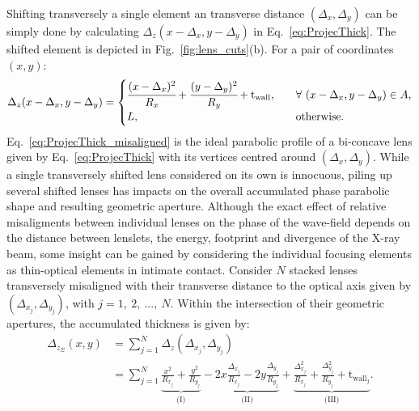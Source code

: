 \begin{refsection}
Shifting transversely a single element an transverse distance $(\Delta_x,\Delta_y)$ can be simply done by calculating $\Delta_z(x-\Delta_x,y-\Delta_y)$ in Eq.~\ref{eq:ProjecThick}. The shifted element is depicted in Fig.~\ref{fig:lens_cuts}(b). For a pair of coordinates $(x,y)$:
\begin{equation}\label{eq:ProjecThick_misaligned}
    \Delta_z(x-\Delta_x,y-\Delta_y) = 
        \begin{cases}
      \cfrac{(x-\Delta_x)^2}{R_x}+\cfrac{(y-\Delta_y)^2}{R_y}+\text{t}_\text{wall}, &\quad\forall~(x-\Delta_x,y-\Delta_y) \in A,\\
      L, &\quad\text{otherwise}.
        \end{cases}
\end{equation}   
Eq.~\ref{eq:ProjecThick_misaligned} is the ideal parabolic profile of a bi-concave lens given by Eq.~\ref{eq:ProjecThick} with its vertices centred around $(\Delta_x,\Delta_y)$. While a single transversely shifted lens considered on its own is innocuous, piling up several shifted lenses has impacts on the overall accumulated phase parabolic shape and resulting geometric aperture. Although the exact effect of relative misaligments between individual lenses on the phase of the wave-field depends on the distance between lenslets, the energy, footprint and divergence of the X-ray beam, some insight can be gained by considering the individual focusing elements as thin-optical elements in intimate contact. Consider $N$ stacked lenses transversely misaligned with their transverse distance to the optical axis given by $(\Delta_{x_j},\Delta_{y_j})$, with $j=1,~2,~...,~N$. Within the intersection of their geometric apertures, the accumulated thickness is given by:
\begin{align}\label{eq:ProjecThick_Nmisaligned}
    \Delta_{z_\Sigma}(x,y) &= \sum\limits_{j=1}^N \Delta_z(\Delta_{x_j},\Delta_{y_j})\nonumber\\
    &=\sum\limits_{j=1}^N \underbrace{\frac{x^2}{R_{x_j}}+\frac{y^2}{R_{y_j}}}_\text{(I)}
    -\underbrace{2x\frac{\Delta_{x_j}}{R_{x_j}} - 2y\frac{\Delta_{y_j}}{R_{y_j}}}_\text{(II)}
    +\underbrace{\frac{\Delta_{x_j}^2}{R_{x_j}}+\frac{\Delta_{y_j}^2}{R_{y_j}}+\text{t}_{\text{wall}_j}}_\text{(III)}.
\end{align}

\end{refsection}
